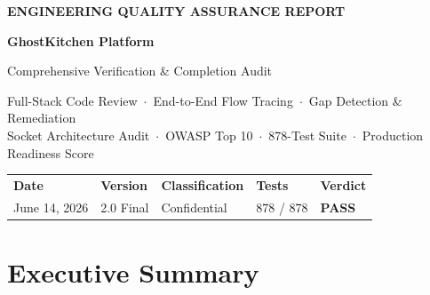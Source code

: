 \documentclass[11pt,a4paper]{article}
\newcommand{\PASS}{\colorbox{successgreen!20}{\color{successgreen}\bfseries\small PASS}}
\begin{document}
\thispagestyle{empty}

\vspace*{0.9cm}

{\color{white!70}\fontsize{9}{11}\selectfont\bfseries\MakeUppercase{Engineering Quality Assurance Report}}

\vspace{0.5cm}
{\color{white}\fontsize{34}{40}\selectfont\bfseries GhostKitchen Platform}

\vspace{0.2cm}
{\color{accentorange!85}\fontsize{17}{22}\selectfont Comprehensive Verification \& Completion Audit}

\vspace{0.5cm}
{\color{white!65}\fontsize{10}{15}\selectfont
Full-Stack Code Review~$\cdot$~End-to-End Flow Tracing~$\cdot$~Gap Detection \& Remediation\\[3pt]
Socket Architecture Audit~$\cdot$~OWASP Top 10~$\cdot$~878-Test Suite~$\cdot$~Production Readiness Score
}

\vspace{5.8cm}

\begin{tabularx}{\textwidth}{@{}XXXXX@{}}
  \color{midgray}\small\bfseries Date & \color{midgray}\small\bfseries Version & \color{midgray}\small\bfseries Classification & \color{midgray}\small\bfseries Tests & \color{midgray}\small\bfseries Verdict \\[2pt]
  \color{white}\small June 14, 2026 & \color{white}\small 2.0 Final & \color{white}\small Confidential & \color{white}\small 878 / 878 & \PASS \\
\end{tabularx}

\newpage

\tableofcontents
\newpage

\section{Executive Summary}
\end{document}

